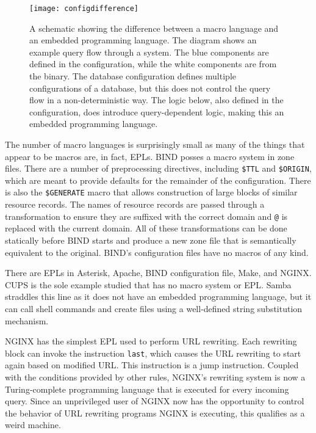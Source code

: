 \documentclass[letterpaper,twocolumn,10pt]{article}
\begin{document}
\begin{figure}
\caption{\label{fig:mve}A schematic showing the difference between a macro language and an embedded programming language. The diagram shows an example query flow through a system. The blue components are defined in the configuration, while the white components are from the binary. The database configuration defines multiple configurations of a database, but this does not control the query flow in a non-deterministic way. The logic below, also defined in the configuration, does introduce query-dependent logic, making this an embedded programming language.}
\texttt{[image: configdifference]}
\end{figure}

The number of macro languages is surprisingly small as many of the things that appear to be macros are, in fact, EPLs. BIND posses a macro system in zone files. There are a number of preprocessing directives, including \texttt{\$TTL} and \texttt{\$ORIGIN}, which are meant to provide defaults for the remainder of the configuration. There is also the \texttt{\$GENERATE} macro that allows construction of large blocks of similar resource records. The names of resource records are passed through a transformation to ensure they are suffixed with the correct domain and \texttt{@} is replaced with the current domain. All of these transformations can be done statically before BIND starts and produce a new zone file that is semantically equivalent to the original. BIND's configuration files have no macros of any kind.

There are EPLs in Asterisk, Apache, BIND configuration file, Make, and NGINX. CUPS is the sole example studied that has no macro system or EPL. Samba straddles this line as it does not have an embedded programming language, but it can call shell commands and create files using a well-defined string substitution mechanism.

NGINX has the simplest EPL used to perform URL rewriting. Each rewriting block can invoke the instruction \texttt{last}, which causes the URL rewriting to start again based on modified URL. This instruction is a jump instruction. Coupled with the conditions provided by other rules, NGINX's rewriting system is now a Turing-complete programming language that is executed for every incoming query. Since an unprivileged user of NGINX now has the opportunity to control the behavior of URL rewriting programs NGINX is executing, this qualifies as a weird machine.
\end{document}
